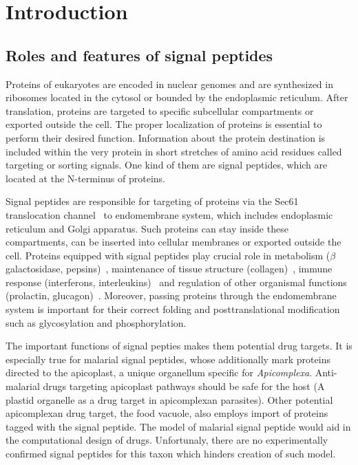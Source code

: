 \documentclass[10pt,letterpaper]{article}
\begin{document}


\linenumbers

\section*{Introduction}
\subsection*{Roles and features of signal peptides}

Proteins of eukaryotes are encoded in nuclear genomes and are synthesized in ribosomes located in the cytosol or bounded by the endoplasmic reticulum. After translation, proteins are targeted to specific subcellular compartments or exported outside the cell. The proper localization of proteins is essential to perform their desired function. Information about the protein destination is included within the very protein in short stretches of amino acid residues called targeting or sorting signals. One kind of them are signal peptides, which are located at the N-terminus of proteins.

Signal peptides are responsible for targeting of proteins via the Sec61 translocation channel~\cite{2007rapoportprotein} to endomembrane system, which includes endoplasmic reticulum and Golgi apparatus. Such proteins can stay inside these compartments, can be inserted into cellular membranes or exported outside the cell. Proteins equipped with signal peptides play crucial role in metabolism ($\beta$ galactosidase, pepsins)~\cite{1991hofmannmutations}, maintenance of tissue structure (collagen)~\cite{2001chanaberrant}, immune response (interferons, interleukins)~\cite{2005zhangalteration} and regulation of other organismal functions (prolactin, glucagon)~\cite{2010huangrole}. Moreover, passing proteins through the endomembrane system is important for their correct folding and posttranslational modification such as glycosylation and phosphorylation.

The important functions of signal pepties makes them potential drug targets. It is especially true for malarial signal peptides, whose additionally mark proteins directed to the apicoplast, a unique organellum specific for \textit{Apicomplexa}. Anti-malarial drugs targeting apicoplast pathways should be safe for the host (A plastid organelle as a drug target in apicomplexan parasites). Other potential apicomplexan drug target, the food vacuole, also employs import of proteins tagged with the signal peptide. The model of malarial signal peptide would aid in the computational design of drugs. Unfortunaly, there are no experimentally confirmed signal peptides for this taxon which hinders creation of such model.
\end{document}
